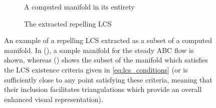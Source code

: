 \begin{figure}[htpb]
    \centering
    \begin{subfigure}[b]{0.475\textwidth}
        \centering
        \caption[]{{\small A computed manifold in its entirety}}
        \label{fig:mf_conversion_mf}
    \end{subfigure}
    \begin{subfigure}[b]{0.475\textwidth}
        \centering
        \caption[]{{\small The extracted repelling LCS}}
        \label{fig:mf_conversion_lcs}
    \end{subfigure}
    \caption[An example of a repelling LCS extracted as a subset of a computed
    manifold]
    {An example of a repelling LCS extracted as a subset of a computed
        manifold. In (), a sample manifold for
        the steady ABC flow is shown, whereas ()
        shows the subset of the manifold which satisfies the LCS existence
        criteria given in \cref{eq:lcs_conditions} (or is sufficiently close
        to any point satisfying these criteria, meaning that their inclusion
        facilitates triangulations which provide an overall enhanced visual
        representation).
    }
    \label{fig:manifold_lcs_conversion}
\end{figure}

